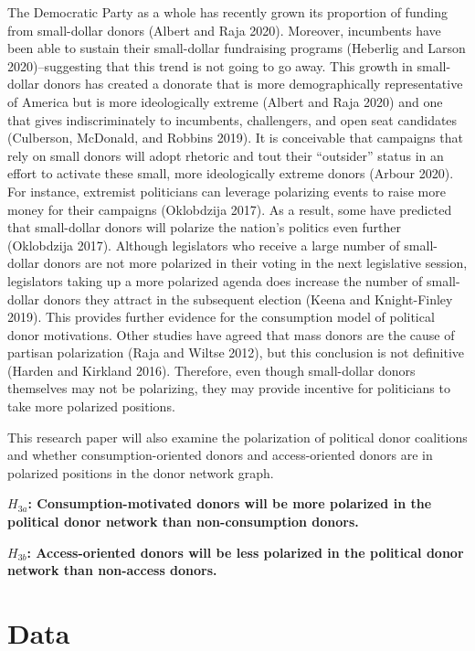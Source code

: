 \documentclass[12pt,]{article}
\begin{document}
The Democratic Party as a whole has recently grown its proportion of
funding from small-dollar donors (Albert and Raja 2020). Moreover,
incumbents have been able to sustain their small-dollar fundraising
programs (Heberlig and Larson 2020)--suggesting that this trend is not
going to go away. This growth in small-dollar donors has created a
donorate that is more demographically representative of America but is
more ideologically extreme (Albert and Raja 2020) and one that gives
indiscriminately to incumbents, challengers, and open seat candidates
(Culberson, McDonald, and Robbins 2019). It is conceivable that
campaigns that rely on small donors will adopt rhetoric and tout their
``outsider'' status in an effort to activate these small, more
ideologically extreme donors (Arbour 2020). For instance, extremist
politicians can leverage polarizing events to raise more money for their
campaigns (Oklobdzija 2017). As a result, some have predicted that
small-dollar donors will polarize the nation's politics even further
(Oklobdzija 2017). Although legislators who receive a large number of
small-dollar donors are not more polarized in their voting in the next
legislative session, legislators taking up a more polarized agenda does
increase the number of small-dollar donors they attract in the
subsequent election (Keena and Knight-Finley 2019). This provides
further evidence for the consumption model of political donor
motivations. Other studies have agreed that mass donors are the cause of
partisan polarization (Raja and Wiltse 2012), but this conclusion is not
definitive (Harden and Kirkland 2016). Therefore, even though
small-dollar donors themselves may not be polarizing, they may provide
incentive for politicians to take more polarized positions.

This research paper will also examine the polarization of political
donor coalitions and whether consumption-oriented donors and
access-oriented donors are in polarized positions in the donor network
graph.

\textbf{\(H_{3a}\): Consumption-motivated donors will be more polarized
in the political donor network than non-consumption donors.}

\textbf{\(H_{3b}\): Access-oriented donors will be less polarized in the
political donor network than non-access donors.}

\hypertarget{data}{%
\section{Data}\label{data}}
\end{document}
